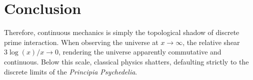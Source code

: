 \section{Conclusion}
Therefore, continuous mechanics is simply the topological shadow of discrete prime interaction. When observing the universe at $x \to \infty$, the relative shear $3 \log(x)/x \to 0$, rendering the universe apparently commutative and continuous. Below this scale, classical physics shatters, defaulting strictly to the discrete limits of the \emph{Principia Psychedelia}.
